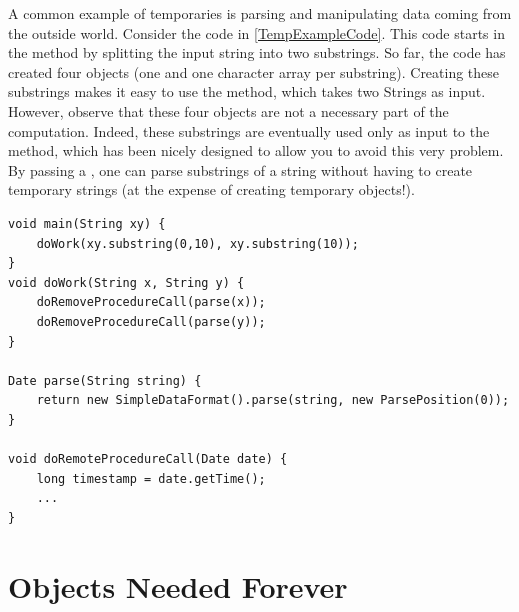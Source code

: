 \begin{example}
A common example of temporaries is parsing
and manipulating data coming from the outside world. 
Consider the code in \autoref{TempExampleCode}. This code starts in
the  method by splitting the input string into two substrings. So
far, the code has created four objects (one  and one character
array per substring). 
Creating these substrings makes it easy to use the  method, which
takes two Strings as input. However, observe
that these four objects are not a necessary part of the computation. Indeed,
these substrings are eventually used only as input to the
  method, which has been nicely designed to
allow you to avoid this very problem. By passing a , one
can parse substrings of a string without having to create temporary strings (at
the expense of creating temporary  objects!).



\begin{lstlisting}[float,caption=Code that constructs 8 temporary objects to handle two dates.,label=TempExampleCode]
void main(String xy) {
	doWork(xy.substring(0,10), xy.substring(10));
}	
void doWork(String x, String y) {
	doRemoveProcedureCall(parse(x));
	doRemoveProcedureCall(parse(y));
}
	
Date parse(String string) {
	return new SimpleDataFormat().parse(string, new ParsePosition(0));
}

void doRemoteProcedureCall(Date date) {
	long timestamp = date.getTime();
	...
}
\end{lstlisting}

\end{example}






\section{Objects Needed Forever}
\label{forever-lifetime}

